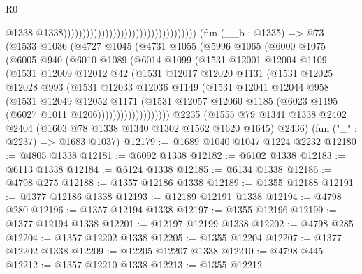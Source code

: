\begin{lexlean}{R0}
\begin{coremodule}
                                                                          @1338
                                                                          @1338)))))))))))))))))))))))))))))))))))
    (fun (__b : @1335) =>
    @73
      (@1533
        @1036
        (@4727
          @1045
          (@4731
            @1055
            (@5996
              @1065
              (@6000
                @1075
                (@6005
                  @940
                  (@6010
                    @1089
                    (@6014
                      @1099
                      (@1531
                        @12001
                        @12004
                        @1109
                        (@1531
                          @12009
                          @12012
                          @42
                          (@1531
                            @12017
                            @12020
                            @1131
                            (@1531
                              @12025
                              @12028
                              @993
                              (@1531
                                @12033
                                @12036
                                @1149
                                (@1531
                                  @12041
                                  @12044
                                  @958
                                  (@1531
                                    @12049
                                    @12052
                                    @1171
                                    (@1531
                                      @12057
                                      @12060
                                      @1185
                                      (@6023 @1195 (@6027 @1011 @1206)))))))))))))))))))
    @2235
    (@1555 @79 @1341 @1338 @2402 @2404 (@1603 @78 @1338 @1340 @1302 @1562 @1620 @1645) @2436)
    (fun ("_" : @2237) => @1683 @1037)
@12179 := @1689 @1040 @1047 @1224 @2232
@12180 := @4805 @1338
@12181 := @6092 @1338
@12182 := @6102 @1338
@12183 := @6113 @1338
@12184 := @6124 @1338
@12185 := @6134 @1338
@12186 := @4798 @275
@12188 := @1357 @12186 @1338
@12189 := @1355 @12188
@12191 := @1377 @12186 @1338
@12193 := @12189 @12191 @1338
@12194 := @4798 @280
@12196 := @1357 @12194 @1338
@12197 := @1355 @12196
@12199 := @1377 @12194 @1338
@12201 := @12197 @12199 @1338
@12202 := @4798 @285
@12204 := @1357 @12202 @1338
@12205 := @1355 @12204
@12207 := @1377 @12202 @1338
@12209 := @12205 @12207 @1338
@12210 := @4798 @445
@12212 := @1357 @12210 @1338
@12213 := @1355 @12212

\end{coremodule}
\end{lexlean}
